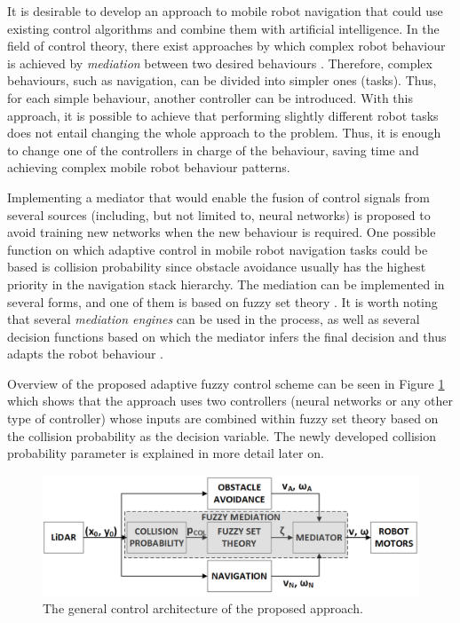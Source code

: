 It is desirable to develop an approach to mobile robot navigation that could use existing control algorithms and combine them with artificial intelligence. In the field of control theory, there exist approaches by which complex robot behaviour is achieved by \emph{mediation} between two desired behaviours \cite{Vincenti2009}. Therefore, complex behaviours, such as navigation, can be divided into simpler ones (tasks). Thus, for each simple behaviour, another controller can be introduced. With this approach, it is possible to achieve that performing slightly different robot tasks does not entail changing the whole approach to the problem. Thus, it is enough to change one of the controllers in charge of the behaviour, saving time and achieving complex mobile robot behaviour patterns. 

Implementing a mediator that would enable the fusion of control signals from several sources (including, but not limited to, neural networks) is proposed to avoid training new networks when the new behaviour is required. One possible function on which adaptive control in mobile robot navigation tasks could be based is collision probability \cite{Lunenburg2017} since obstacle avoidance usually has the highest priority in the navigation stack hierarchy. The mediation can be implemented in several forms, and one of them is based on fuzzy set theory \cite{Chen2017}. It is worth noting that several \emph{mediation engines} can be used in the process, as well as several decision functions based on which the mediator infers the final decision and thus adapts the robot behaviour \cite{Vincenti2009}.

Overview of the proposed adaptive fuzzy control scheme can be seen in Figure \ref{Fig:Blok} which shows that the approach uses two controllers (neural networks or any other type of controller) whose inputs are combined within fuzzy set theory based on the collision probability as the decision variable. The newly developed collision probability parameter is explained in more detail later on.

\begin{figure}
\centering
\includegraphics[width=0.95\columnwidth]{slike/blok.png}
\caption{The general control architecture of the proposed approach.} 
\label{Fig:Blok}
\end{figure}

